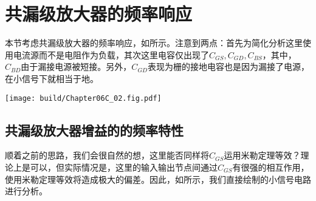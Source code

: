 \section{共漏级放大器的频率响应}
本节考虑共漏级放大器的频率响应，如所示。注意到两点：首先为简化分析这里使用电流源而不是电阻作为负载，其次这里电容仅出现了$C_{GS},C_{GD},C_{BS}$，其中，$C_{BD}$由于漏接电源被短接。另外，$C_{GD}$表现为栅的接地电容也是因为漏接了电源，在小信号下就相当于地。

\begin{Figure}[共漏级放大器的频率响应电路]
    \texttt{[image: build/Chapter06C\_02.fig.pdf]}
\end{Figure}

\subsection{共漏级放大器增益的的频率特性}
顺着之前的思路，我们会很自然的想，这里能否同样将$C_{GS}$运用米勒定理等效？理论上是可以，但实际情况是，这里的输入输出节点间通过$C_{GS}$有很强的相互作用，使用米勒定理等效将造成极大的偏差。因此，如所示，我们直接绘制的小信号电路进行分析。

